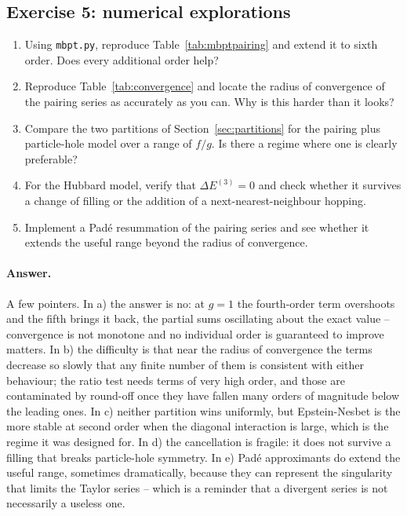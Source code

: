 \subsection*{Exercise 5: numerical explorations}
\label{ex:9-numerical}

\begin{enumerate}
  \item[a)] Using \texttt{mbpt.py}, reproduce Table~\ref{tab:mbptpairing} and
  extend it to sixth order.  Does every additional order help?
  \item[b)] Reproduce Table~\ref{tab:convergence} and locate the radius of
  convergence of the pairing series as accurately as you can.  Why is this
  harder than it looks?
  \item[c)] Compare the two partitions of Section~\ref{sec:partitions} for
  the pairing plus particle-hole model over a range of $f/g$.  Is there a
  regime where one is clearly preferable?
  \item[d)] For the Hubbard model, verify that $\Delta E^{(3)}=0$ and check
  whether it survives a change of filling or the addition of a
  next-nearest-neighbour hopping.
  \item[e)] Implement a Pad\'e resummation of the pairing series and see
  whether it extends the useful range beyond the radius of convergence.
\end{enumerate}

\paragraph{Answer.}
A few pointers.  In a) the answer is no: at $g=1$ the fourth-order term
overshoots and the fifth brings it back, the partial sums oscillating about
the exact value -- convergence is not monotone and no individual order is
guaranteed to improve matters.  In b) the difficulty is that near the radius
of convergence the terms decrease so slowly that any finite number of them is
consistent with either behaviour; the ratio test needs terms of very high
order, and those are contaminated by round-off once they have fallen many
orders of magnitude below the leading ones.  In c) neither partition wins
uniformly, but Epstein-Nesbet is the more stable at second order when the
diagonal interaction is large, which is the regime it was designed for.  In
d) the cancellation is fragile: it does not survive a filling that breaks
particle-hole symmetry.  In e) Pad\'e approximants do extend the useful
range, sometimes dramatically, because they can represent the singularity
that limits the Taylor series -- which is a reminder that a divergent series
is not necessarily a useless one.
